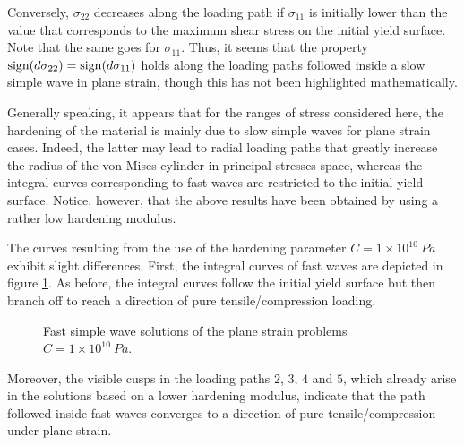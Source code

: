 Conversely, $\sigma_{22}$ decreases along the loading path if $\sigma_{11}$ is initially lower than the value that corresponds to the maximum shear stress on the initial yield surface.
Note that the same goes for $\sigma_{11}$.
Thus, it seems that the property $\operatorname{sign}(d\sigma_{22})=\operatorname{sign}(d\sigma_{11})$ holds along the loading paths followed inside a slow simple wave in plane strain, though this has not been highlighted mathematically.

Generally speaking, it appears that for the ranges of stress considered here, the hardening of the material is mainly due to slow simple waves for plane strain cases.
Indeed, the latter may lead to radial loading paths that greatly increase the radius of the von-Mises cylinder in principal stresses space, whereas the integral curves corresponding to fast waves are restricted to the initial yield surface. Notice, however, that the above results have been obtained by using a rather low hardening modulus.



The curves resulting from the use of the hardening parameter $C=1\times10^{10} \: Pa$ exhibit slight differences.
First, the integral curves of fast waves are depicted in figure \ref{fig:fast_H}.
As before, the integral curves follow the initial yield surface but then branch off to reach a direction of pure tensile/compression loading.
\begin{figure}[h!]
  \centering
  
  \caption{Fast simple wave solutions of the plane strain problems $C=1\times10^{10} \: Pa$.}
  \label{fig:fast_H}
\end{figure}
Moreover, the visible cusps in the loading paths $2$, $3$, $4$ and $5$, which already arise in the solutions based on a lower hardening modulus, indicate that the path followed inside fast waves converges to a direction of pure tensile/compression under plane strain. 

